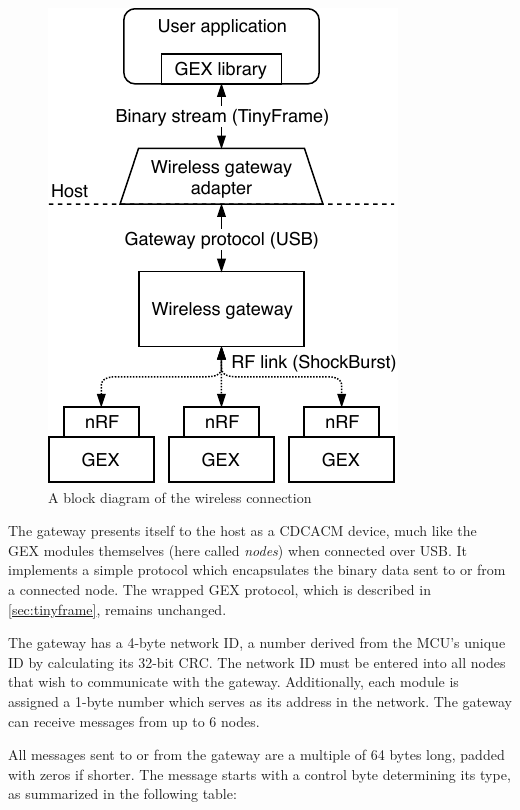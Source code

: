 \begin{figure}
	\vspace{-1em}
	\centering
	\includegraphics[scale=0.9]{img/rf-gw.pdf}
	\caption{A block diagram of the wireless connection}
\end{figure}

The gateway presents itself to the host as a \gls{CDCACM} device, much like the GEX modules themselves (here called \textit{nodes}) when connected over \gls{USB}. It implements a simple protocol which encapsulates the binary data sent to or from a connected node. The wrapped GEX protocol, which is described in \cref{sec:tinyframe}, remains unchanged.

The gateway has a 4-byte network ID, a number derived from the \gls{MCU}'s unique ID by calculating its 32-bit \gls{CRC}. The network ID must be entered into all nodes that wish to communicate with the gateway. Additionally, each module is assigned a 1-byte number which serves as its address in the network. The gateway can receive messages from up to 6 nodes.

All messages sent to or from the gateway are a multiple of 64 bytes long, padded with zeros if shorter. The message starts with a control byte determining its type, as summarized in the following table:

